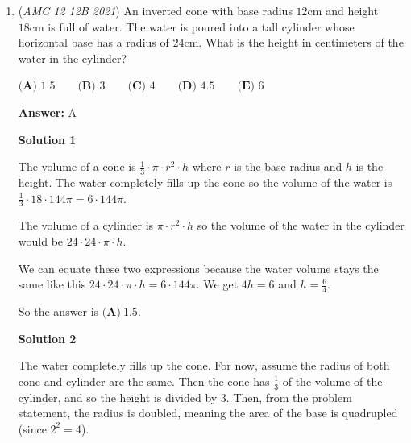\begin{enumerate}
 


 



\textbf{Solution 6 (Working Backwards Approach, Super Easy!)}

The last thing that happened was the reflection over the line $y = -x$, so we reverse that by reflecting $(-6,3)$ over $y = -x$ to get $(-3,6)$. Now, we have to rotate it $\textbf{clockwise}$, to reverse the first step. To rotate $(-3,6)$ over the point $(1,5)$ clockwise 90 degrees, we can subtract $1$ from each x-coordinate and subtract $5$ from each y-coordinate. That way, we only have to rotate $(-4,1)$ clockwise 90 degrees over the origin $(0,0)$. This is pretty easy to do in your head, so you get $(1,4)$. But we are not, done, we still have to add $1$ to each x-coordinate and add $5$ to each y-coordinate, to get $(2,9)$, so our final answer is $9 - 2 = 7$, which is $\boxed{\textbf{(D)} ~7}$.

 


	\item (\textit{AMC 12 12B 2021}) An inverted cone with base radius $12 \text{cm}$ and height $18\text{cm}$ is full of water. The water is poured into a tall cylinder whose horizontal base has a radius of $24\text{cm}$. What is the height in centimeters of the water in the cylinder?


 $\textbf{(A) }1.5 \qquad \textbf{(B) }3 \qquad \textbf{(C) }4 \qquad \textbf{(D) }4.5 \qquad \textbf{(E) }6$

 \textbf{Answer: }A



\textbf{Solution 1}

The volume of a cone is $\frac{1}{3} \cdot\pi \cdot r^2 \cdot h$ where $r$ is the base radius and $h$ is the height. The water completely fills up the cone so the volume of the water is $\frac{1}{3}\cdot18\cdot144\pi = 6\cdot144\pi$.

 The volume of a cylinder is $\pi \cdot r^2 \cdot h$ so the volume of the water in the cylinder would be $24\cdot24\cdot\pi\cdot h$.

 We can equate these two expressions because the water volume stays the same like this $24\cdot24\cdot\pi\cdot h = 6\cdot144\pi$. We get $4h = 6$ and $h=\frac{6}{4}$.

 So the answer is $\boxed{\textbf{(A)} ~1.5}.$




\textbf{Solution 2}

The water completely fills up the cone. For now, assume the radius of both cone and cylinder are the same. Then the cone has $\frac{1}{3}$ of the volume of the cylinder, and so the height is divided by $3$. Then, from the problem statement, the radius is doubled, meaning the area of the base is quadrupled (since $2^2 = 4$).


\end{enumerate}
